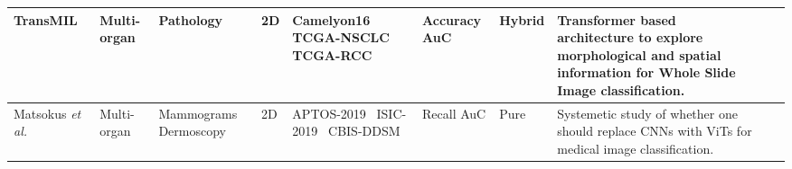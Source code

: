 \begin{table}[]
{\begin{tabular}{V{3}l|l|p{2cm}|l|p{2.5cm}|p{2cm}|l|p{7cm}V{3}}
 {\color{teal}TransMIL}~\cite{shao2021transmil}                                                  & Multi-organ    & Pathology                                                        & 2D                        & Camelyon16~\cite{bejnordi2017diagnostic} \newline TCGA-NSCLC~\cite{bakr2018radiogenomic} \newline TCGA-RCC~\cite{tcga}         & Accuracy \newline AuC                  & Hybrid         &  Transformer based architecture to explore morphological and spatial information for Whole Slide Image  classification.                                        \\ \hline

Matsokus \textit{et al.}\cite{matsoukas2021time} & Multi-organ    & Mammograms \newline Dermoscopy & 2D                        & APTOS-2019~\cite{aptos19} \newline ISIC-2019~\cite{isic19} \newline CBIS-DDSM~\cite{lee2017curated}         & Recall \newline AuC                                               & Pure           & Systemetic study of whether one should replace CNNs with ViTs for medical image classification. \\ \hline


\end{tabular}}
\end{table}

